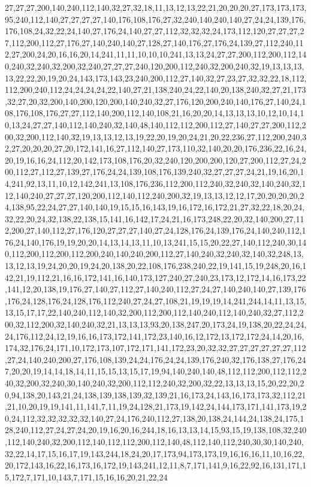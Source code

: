27,27,27,200,140,240,112,140,32,27,32,18,11,13,12,13,22,21,20,20,20,27,173,173,173,95,240,112,140,27,27,27,27,140,176,108,176,27,32,240,140,240,140,27,24,24,139,176,176,108,24,32,22,24,140,27,176,24,140,27,27,112,32,32,32,24,173,112,120,27,27,27,27,112,200,112,27,176,27,140,240,140,27,128,27,140,176,27,176,24,139,27,112,240,112,27,200,24,20,16,16,20,14,241,11,11,10,10,10,241,13,13,24,27,27,200,112,200,112,140,240,32,240,32,200,32,240,27,27,27,240,120,200,112,240,32,200,240,32,19,13,13,13,13,22,22,20,19,20,24,143,173,143,23,240,200,112,27,140,32,27,23,27,32,32,22,18,112,112,200,240,112,24,24,24,24,22,140,27,21,138,240,24,22,140,20,138,240,32,27,21,173,32,27,20,32,200,140,200,120,200,140,240,32,27,176,120,200,240,140,176,27,140,24,108,176,108,176,27,27,112,140,200,112,140,108,21,16,20,20,14,13,13,13,10,12,10,14,10,13,24,27,27,140,112,140,240,32,140,48,140,112,112,200,112,27,140,27,27,200,112,200,32,200,112,140,32,19,13,13,12,13,19,22,20,19,20,24,21,20,22,236,27,112,200,240,32,27,20,20,20,27,20,172,141,16,27,112,140,27,173,110,32,140,20,20,176,236,22,16,24,20,19,16,16,24,112,20,142,173,108,176,20,32,240,120,200,200,120,27,200,112,27,24,200,112,27,112,27,139,27,176,24,24,139,108,176,139,240,32,27,27,27,24,21,19,16,20,14,241,92,13,11,10,12,142,241,13,108,176,236,112,200,112,240,32,240,32,140,240,32,112,140,240,27,27,27,120,200,112,140,112,240,200,32,19,13,13,12,12,17,20,20,20,20,24,138,95,22,24,27,27,140,140,19,15,15,16,143,19,16,172,16,172,21,27,32,22,18,20,24,32,22,20,24,32,138,22,138,15,141,16,142,17,24,21,16,173,248,22,20,32,140,200,27,112,200,27,140,112,27,176,120,27,27,27,140,27,24,128,176,24,139,176,24,140,240,112,176,24,140,176,19,19,20,20,14,13,14,13,11,10,13,241,15,15,20,22,27,140,112,240,30,140,112,200,112,200,112,200,240,140,240,200,112,27,140,240,32,240,32,140,32,248,13,13,12,13,19,24,20,20,19,24,20,138,20,22,108,176,238,240,22,19,141,15,19,248,20,16,142,21,19,112,21,16,16,172,141,16,140,173,127,240,27,240,23,173,12,172,14,16,173,22,141,12,20,138,19,176,27,140,27,112,27,140,240,112,27,24,27,140,240,140,27,139,176,176,24,128,176,24,128,176,112,240,27,24,27,108,21,19,19,19,14,241,244,14,11,13,15,13,15,17,17,22,140,240,112,140,32,200,112,200,112,140,240,112,140,240,32,27,112,200,32,112,200,32,140,240,32,21,13,13,13,93,20,138,247,20,173,24,19,138,20,22,24,24,24,176,112,24,12,19,16,16,173,172,141,172,23,140,16,12,172,13,172,172,24,14,20,16,174,32,176,24,171,10,172,173,107,172,171,141,172,23,20,32,32,27,27,27,27,27,27,112,27,24,140,240,200,27,176,108,139,24,24,176,24,24,139,176,240,32,176,138,27,176,247,20,20,19,14,14,18,14,11,15,15,13,15,17,19,94,140,240,140,48,112,112,200,112,112,240,32,200,32,240,30,140,240,32,200,112,112,240,32,200,32,22,13,13,13,15,20,22,20,20,94,138,20,143,21,24,138,139,138,139,32,139,21,16,173,24,143,16,173,173,32,112,21,21,10,20,19,19,141,11,141,7,11,19,24,128,21,173,19,142,24,144,173,171,141,173,19,20,24,112,32,32,32,32,32,140,27,24,176,240,112,27,138,20,138,24,144,24,138,24,175,128,240,112,27,24,27,24,20,19,16,20,16,244,18,16,13,13,14,15,93,15,19,138,108,32,240,112,140,240,32,200,112,140,112,112,200,112,140,48,112,140,112,240,30,30,140,240,32,22,14,17,15,16,17,19,143,244,18,24,20,17,173,94,173,173,19,16,16,16,11,10,16,22,20,172,143,16,22,16,173,16,172,19,143,241,12,11,8,7,171,141,9,16,22,92,16,131,171,15,172,7,171,10,143,7,171,15,16,16,20,21,22,24